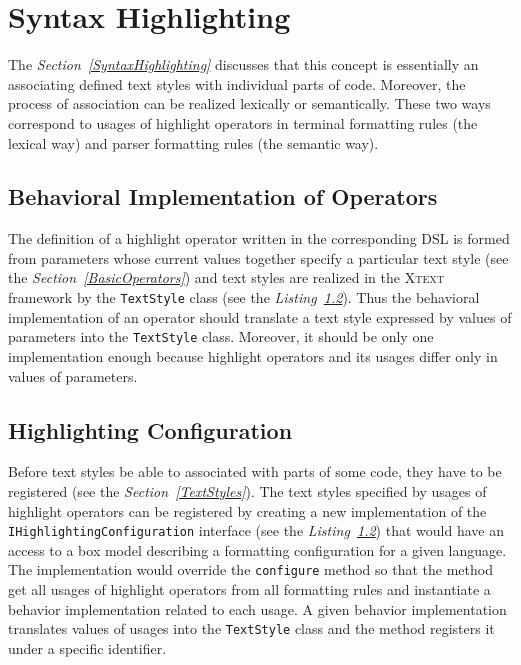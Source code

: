 \documentclass[12pt,notitlepage,a4paper]{report}
\begin{document}
\section{Syntax Highlighting}

 The \textit{Section~\ref{SyntaxHighlighting}} discusses that this concept is essentially an associating defined text styles with individual parts of code. Moreover, the process of association can be realized lexically or semantically. These two ways correspond to usages of highlight operators in terminal formatting rules (the lexical way) and parser formatting rules (the semantic way).

\subsection{Behavioral Implementation of Operators}
 The definition of a highlight operator written in the corresponding DSL is formed from parameters whose current values together specify a particular text style (see the \textit{Section~\ref{BasicOperators}}) and text styles are realized in the \textsc{Xtext} framework by the \texttt{TextStyle} class (see the \textit{Listing~\ref{HighlightingConfiguration}}). Thus the behavioral implementation of an operator should translate a text style expressed by values of parameters into the \texttt{TextStyle} class. Moreover, it should be only one implementation enough  because highlight operators and its usages differ only in values of parameters.

\subsection{Highlighting Configuration}
\label{HighlightingConfiguration}
Before text styles be able to associated with parts of some code, they have to be registered (see the \textit{Section~\ref{TextStyles}}). The text styles specified by usages of highlight operators can be registered by creating a new implementation of the \texttt{IHighlightingConfiguration} interface (see the \textit{Listing~\ref{HighlightingConfiguration}}) that would have an access to a box model describing a formatting configuration for a given language. The implementation would override the \texttt{configure} method so that the method get all usages of highlight operators from all formatting rules and instantiate a behavior implementation related to each usage. A given behavior implementation translates values of usages into the \texttt{TextStyle} class and the method registers it under a specific identifier. 
\end{document}
